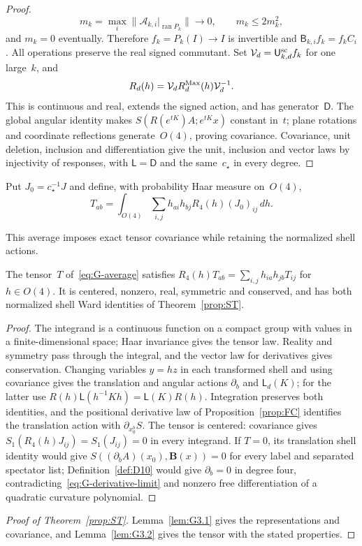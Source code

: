 \begin{proof}
\begin{equation*}
m_k=\max_i\|\mathcal A_{k,i}|_{\operatorname{ran}P_k}\|\longrightarrow0,
\qquad m_k\le2m_k^2,
\end{equation*}
and $m_k=0$ eventually. Therefore $f_k=P_k(I)\to I$ is invertible and $\mathsf B_{k,i}f_k=f_kC_i$. All operations preserve the real signed commutant. Set $\mathcal V_d=\mathsf{U}_{k,d}^{\mathrm{sc}}f_k$ for one large~$k$, and
\begin{equation*}
R_d(h)=\mathcal V_d R_d^{\rm Max}(h)\mathcal V_d^{-1}.
\end{equation*}
This is continuous and real, extends the signed action, and has generator~$\mathsf D$. The global angular identity makes $S(R(e^{tK})A;e^{tK}x)$ constant in~$t$; plane rotations and coordinate reflections generate~$O(4)$, proving covariance. Covariance, unit deletion, inclusion and differentiation give the unit, inclusion and vector laws by injectivity of responses, with $\mathsf L=\mathsf D$ and the same~$c_\star$ in every degree.
\end{proof}

Put $J_0=c_\star^{-1}J$ and define, with probability Haar measure on~$O(4)$,
\begin{equation}\label{eq:G-average}
T_{ab}=\int_{O(4)}\sum_{i,j}h_{ai}h_{bj}R_4(h)(J_0)_{ij}\,dh.
\end{equation}
\begin{samepage}
This average imposes exact tensor covariance while retaining the normalized shell actions.
\begin{lemma}\label{lem:G3.2}
The tensor~$T$ of~\eqref{eq:G-average} satisfies $R_4(h)T_{ab}=\sum_{i,j}h_{ia}h_{jb}T_{ij}$ for $h\in O(4)$. It is centered, nonzero, real, symmetric and conserved, and has both normalized shell Ward identities of Theorem~\ref{prop:ST}.
\end{lemma}
\end{samepage}
\begin{proof}
The integrand is a continuous function on a compact group with values in a finite-dimensional space; Haar invariance gives the tensor law. Reality and symmetry pass through the integral, and the vector law for derivatives gives conservation. Changing variables $y=hz$ in each transformed shell and using covariance gives the translation and angular actions $\partial_b$ and $\mathsf L_d(K)$; for the latter use $R(h)\mathsf L(h^{-1}Kh)=\mathsf L(K)R(h)$. Integration preserves both identities, and the positional derivative law of Proposition~\ref{prop:FC} identifies the translation action with $\partial_{x_0^b}S$. The tensor is centered: covariance gives $S_1(R_4(h)J_{ij})=S_1(J_{ij})=0$ in every integrand. If $T=0$, its translation shell identity would give $S((\partial_bA)(x_0),\boldsymbol B(x))=0$ for every label and separated spectator list; Definition~\ref{def:D10} would give $\partial_b=0$ in degree four, contradicting~\eqref{eq:G-derivative-limit} and nonzero free differentiation of a quadratic curvature polynomial.
\end{proof}
\begin{proof}[Proof of Theorem~\ref{prop:ST}]
Lemma~\ref{lem:G3.1} gives the representations and covariance, and Lemma~\ref{lem:G3.2} gives the tensor with the stated properties.
\end{proof}


